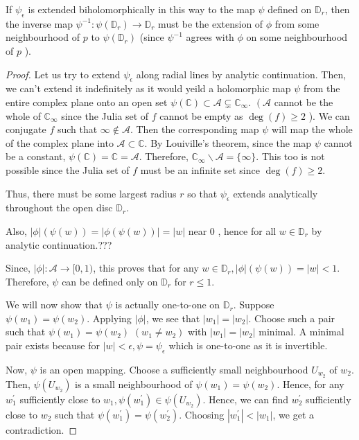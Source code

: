 If $\psi_{\epsilon}$ is extended biholomorphically in this way to the map $\psi$ defined on $\mathbb{D}_{r}$, then the inverse map $\psi^{-1}: \psi\left(\mathbb{D}_{r}\right) \rightarrow \mathbb{D}_{r}$ must be the extension of $\phi$ from some neighbourhood of $p$ to $\psi\left(\mathbb{D}_{r}\right)$ (since $\psi^{-1}$ agrees with $\phi$ on some neighbourhood of $p$ ).

\begin{proof}
Let us try to extend $\psi_{\epsilon}$ along radial lines by analytic continuation. Then, we can't extend it indefinitely as it would yeild a holomorphic map $\psi$ from the entire complex plane onto an open set $\psi(\mathbb{C}) \subset \mathcal{A} \varsubsetneq \mathbb{C}_{\infty}$. $\left(\mathcal{A}\right.$ cannot be the whole of $\mathbb{C}_{\infty}$ since the Julia set of $f$ cannot be empty as $\operatorname{deg}(f) \geq 2$ ). We can conjugate $f$ such that $\infty \notin \mathcal{A}$. Then the corresponding map $\psi$ will map the whole of the complex plane into $\mathcal{A} \subset \mathbb{C}$. By Louiville's theorem, since the map $\psi$ cannot be a constant, $\psi(\mathbb{C})=\mathbb{C}=\mathcal{A}$. Therefore, $\mathbb{C}_{\infty} \backslash \mathcal{A}=\{\infty\}$. This too is not possible since the Julia set of $f$ must be an infinite set since $\operatorname{deg}(f) \geq 2$.

Thus, there must be some largest radius $r$ so that $\psi_{\epsilon}$ extends analytically throughout the open disc $\mathbb{D}_{r}$.

Also, $|\phi|(\psi(w))=|\phi(\psi(w))|=|w|$ near 0 , hence for all $w \in \mathbb{D}_{r}$ by analytic continuation.???

Since, $|\phi|: \mathcal{A} \rightarrow[0,1)$, this proves that for any $w \in \mathbb{D}_{r},|\phi|(\psi(w))=|w|<1$. Therefore, $\psi$ can be defined only on $\mathbb{D}_{r}$ for $r \leq 1$.

We will now show that $\psi$ is actually one-to-one on $\mathbb{D}_{r}$. Suppose $\psi\left(w_{1}\right)=\psi\left(w_{2}\right)$. Applying $|\phi|$, we see that $\left|w_{1}\right|=\left|w_{2}\right|$. Choose such a pair such that $\psi\left(w_{1}\right)=\psi\left(w_{2}\right)$ $\left(w_{1} \neq w_{2}\right)$ with $\left|w_{1}\right|=\left|w_{2}\right|$ minimal. A minimal pair exists because for $|w|<\epsilon, \psi=\psi_{\epsilon}$ which is one-to-one as it is invertible.

Now, $\psi$ is an open mapping. Choose a sufficiently small neighbourhood $U_{w_{2}}$ of $w_{2}$. Then, $\psi\left(U_{w_{2}}\right)$ is a small neighbourhood of $\psi\left(w_{1}\right)=\psi\left(w_{2}\right)$. Hence, for any $w_{1}^{\prime}$ sufficiently close to $w_{1}, \psi\left(w_{1}^{\prime}\right) \in \psi\left(U_{w_{2}}\right)$. Hence, we can find $w_{2}^{\prime}$ sufficiently close to $w_{2}$ such that $\psi\left(w_{1}^{\prime}\right)=\psi\left(w_{2}^{\prime}\right)$. Choosing $\left|w_{1}^{\prime}\right|<\left|w_{1}\right|$, we get a contradiction.


\end{proof}
